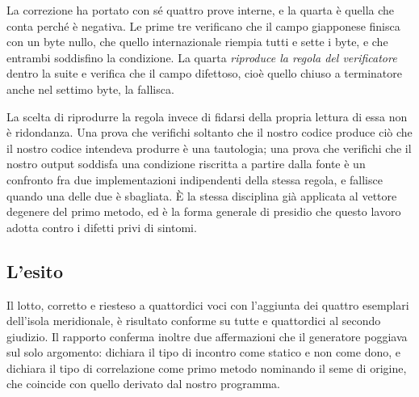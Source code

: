 La correzione ha portato con sé quattro prove interne, e la quarta è quella che conta perché è negativa. Le prime tre verificano che il campo giapponese finisca con un byte nullo, che quello internazionale riempia tutti e sette i byte, e che entrambi soddisfino la condizione. La quarta \emph{riproduce la regola del verificatore} dentro la suite e verifica che il campo difettoso, cioè quello chiuso a terminatore anche nel settimo byte, la fallisca.

La scelta di riprodurre la regola invece di fidarsi della propria lettura di essa non è ridondanza. Una prova che verifichi soltanto che il nostro codice produce ciò che il nostro codice intendeva produrre è una tautologia; una prova che verifichi che il nostro output soddisfa una condizione riscritta a partire dalla fonte è un confronto fra due implementazioni indipendenti della stessa regola, e fallisce quando una delle due è sbagliata. È la stessa disciplina già applicata al vettore degenere del primo metodo, ed è la forma generale di presidio che questo lavoro adotta contro i difetti privi di sintomi.

\subsection{L'esito}

Il lotto, corretto e riesteso a quattordici voci con l'aggiunta dei quattro esemplari dell'isola meridionale, è risultato conforme su tutte e quattordici al secondo giudizio. Il rapporto conferma inoltre due affermazioni che il generatore poggiava sul solo argomento: dichiara il tipo di incontro come statico e non come dono, e dichiara il tipo di correlazione come primo metodo nominando il seme di origine, che coincide con quello derivato dal nostro programma.
